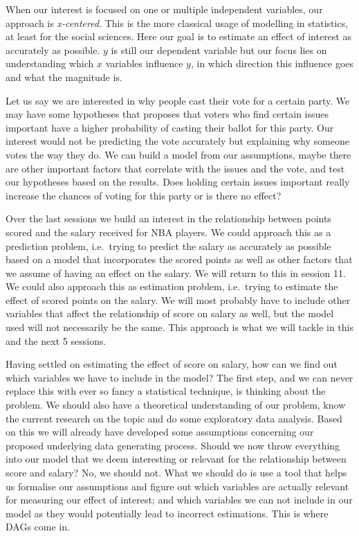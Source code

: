 \documentclass[
]{book}
\begin{document}
When our interest is focused on one or multiple independent variables, our
approach is \emph{x-centered}. This is the more classical usage of modelling in
statistics, at least for the social sciences.
Here our goal is to estimate an effect of interest as accurately as possible.
\(y\) is still our dependent variable but our focus lies on understanding which
\(x\) variables influence \(y\), in which direction this influence goes and what the
magnitude is.

Let us say we are interested in why people cast their vote for a certain party.
We may have some hypotheses that proposes that voters who find certain issues
important have a higher probability of casting their ballot for this party. Our
interest would not be predicting the vote accurately but explaining why someone
votes the way they do. We can build a model from our assumptions, maybe there
are other important factors that correlate with the issues and the vote, and
test our hypotheses based on the results. Does holding certain issues important
really increase the chances of voting for this party or is there no effect?

Over the last sessions we build an interest in the relationship between points
scored and the salary received for NBA players. We could approach this as a
prediction problem, i.e.~trying to predict the salary as accurately as possible
based on a model that incorporates the scored points as well as other factors
that we assume of having an effect on the salary. We will return to this in
session 11. We could also approach this as estimation problem, i.e.~trying to
estimate the effect of scored points on the salary. We will most probably have
to include other variables that affect the relationship of score on salary as
well, but the model used will not necessarily be the same. This approach is what
we will tackle in this and the next 5 sessions.

Having settled on estimating the effect of score on salary, how can we find out
which variables we have to include in the model? The first step, and we can
never replace this with ever so fancy a statistical technique, is thinking about
the problem. We should also have a theoretical understanding of our problem,
know the current research on the topic and do some exploratory data analysis.
Based on this we will already have developed some assumptions concerning our
proposed underlying data generating process. Should we now throw everything into
our model that we deem interesting or relevant for the relationship between
score and salary? No, we should not. What we should do is use a tool that helps
us formalise our assumptions and figure out which variables are actually
relevant for measuring our effect of interest; and which variables we can not
include in our model as they would potentially lead to incorrect estimations.
This is where DAGs come in.
\end{document}
